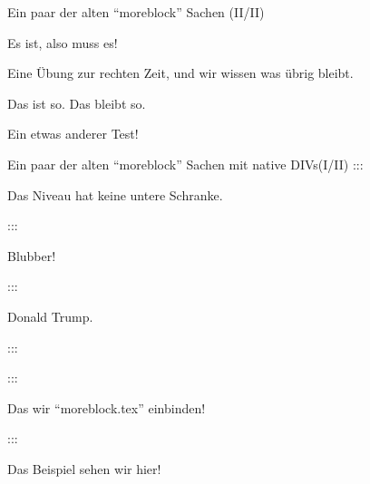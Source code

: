 \documentclass[
  ignorenonframetext,
]{beamer}
\begin{document}
\begin{frame}{Ein paar der alten ``moreblock'' Sachen (II/II)}
\protect\hypertarget{ein-paar-der-alten-moreblock-sachen-iiii}{}
\begin{definition}

Es ist, also muss es!

\end{definition}

\begin{Uebung}

Eine Übung zur rechten Zeit, und wir wissen was übrig bleibt.

\end{Uebung}

\begin{Fakt}

Das ist so. Das bleibt so.

\end{Fakt}

\begin{Beispiel}[\(<\) \(>\) \(\leq\)]

Ein etwas anderer Test!

\end{Beispiel}
\end{frame}

\begin{frame}{Ein paar der alten ``moreblock'' Sachen mit native
DIVs(I/II)}
\protect\hypertarget{ein-paar-der-alten-moreblock-sachen-mit-native-divsiii}{}
:::

\begin{Satz}

Das Niveau hat keine untere Schranke.

:::

Blubber!

:::

\end{Satz}

\begin{Beweis}

Donald Trump.

:::

:::

\end{Beweis}

\begin{Bemerkung}

Das wir ``moreblock.tex'' einbinden!

:::

\end{Bemerkung}

\begin{Beispiel}

Das Beispiel sehen wir hier!

\end{Beispiel}
\end{frame}
\end{document}
